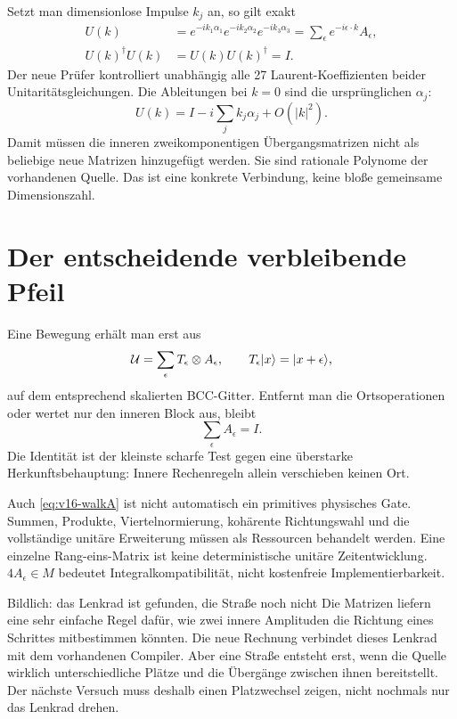 Setzt man dimensionlose Impulse $k_j$ an, so gilt exakt
\begin{align}
U(k)&=e^{-ik_1\alpha_1}e^{-ik_2\alpha_2}e^{-ik_3\alpha_3}
=\sum_\epsilon e^{-i\epsilon\cdot k}A_\epsilon,\\
U(k)^\dagger U(k)&=U(k)U(k)^\dagger=I.
\end{align}
Der neue Prüfer kontrolliert unabhängig alle 27 Laurent-Koeffizienten beider Unitaritätsgleichungen. Die Ableitungen bei $k=0$ sind die ursprünglichen $\alpha_j$:
\begin{equation}
U(k)=I-i\sum_j k_j\alpha_j+O(|k|^2).
\end{equation}
Damit müssen die inneren zweikomponentigen Übergangsmatrizen nicht als beliebige neue Matrizen hinzugefügt werden. Sie sind rationale Polynome der vorhandenen Quelle. Das ist eine konkrete Verbindung, keine bloße gemeinsame Dimensionszahl. 

\section{Der entscheidende verbleibende Pfeil}
Eine Bewegung erhält man erst aus
\begin{equation}
\mathcal U=\sum_\epsilon T_\epsilon\otimes A_\epsilon,
\qquad T_\epsilon\lvert x\rangle=\lvert x+\epsilon\rangle,
\end{equation}
auf dem entsprechend skalierten BCC-Gitter. Entfernt man die Ortsoperationen oder wertet nur den inneren Block aus, bleibt
\begin{equation}
\boxed{\sum_\epsilon A_\epsilon=I.}
\label{eq:v16-no-motion}
\end{equation}
Die Identität ist der kleinste scharfe Test gegen eine überstarke Herkunftsbehauptung: Innere Rechenregeln allein verschieben keinen Ort.

Auch \eqref{eq:v16-walkA} ist nicht automatisch ein primitives physisches Gate. Summen, Produkte, Viertelnormierung, kohärente Richtungswahl und die vollständige unitäre Erweiterung müssen als Ressourcen behandelt werden. Eine einzelne Rang-eins-Matrix ist keine deterministische unitäre Zeitentwicklung. $4A_\epsilon\in M$ bedeutet Integralkompatibilität, nicht kostenfreie Implementierbarkeit.

\begin{bild}{Bildlich: das Lenkrad ist gefunden, die Straße noch nicht}
Die Matrizen liefern eine sehr einfache Regel dafür, wie zwei innere Amplituden die Richtung eines Schrittes mitbestimmen könnten. Die neue Rechnung verbindet dieses Lenkrad mit dem vorhandenen Compiler. Aber eine Straße entsteht erst, wenn die Quelle wirklich unterschiedliche Plätze und die Übergänge zwischen ihnen bereitstellt. Der nächste Versuch muss deshalb einen Platzwechsel zeigen, nicht nochmals nur das Lenkrad drehen.
\end{bild}

